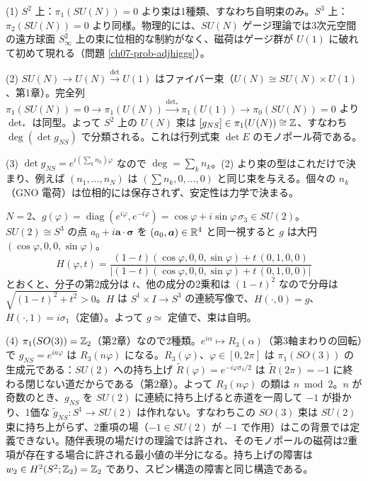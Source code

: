 \begin{solution}
(1) $S^2$ 上：$\pi_1(SU(N))=0$ より束は1種類、すなわち自明束のみ。$S^3$ 上：$\pi_2(SU(N))=0$ より同様。物理的には、$SU(N)$ ゲージ理論では3次元空間の遠方球面 $S^2_\infty$ 上の束に位相的な制約がなく、磁荷はゲージ群が $U(1)$ に破れて初めて現れる（問題 \ref{ch07-prob-adjhiggs}）。

(2) $SU(N)\to U(N)\xrightarrow{\det}U(1)$ はファイバー束（$U(N)\cong SU(N)\times U(1)$、第1章）。完全列 $\pi_1(SU(N))=0\to\pi_1(U(N))\xrightarrow{\det_*}\pi_1(U(1))\to\pi_0(SU(N))=0$ より $\det_*$ は同型。よって $S^2$ 上の $U(N)$ 束は $[g_{NS}]\in\pi_1(U(N))\cong\mathbb{Z}$、すなわち $\deg(\det g_{NS})$ で分類される。これは行列式束 $\det E$ のモノポール荷である。

(3) $\det g_{NS}=e^{i(\sum_kn_k)\varphi}$ なので $\deg=\sum_kn_k$。(2) より束の型はこれだけで決まり、例えば $(n_1,\dots,n_N)$ は $(\sum n_k,0,\dots,0)$ と同じ束を与える。個々の $n_k$（GNO 電荷）は位相的には保存されず、安定性は力学で決まる。

$N=2$、$g(\varphi)=\operatorname{diag}(e^{i\varphi},e^{-i\varphi})=\cos\varphi+i\sin\varphi\,\sigma_3\in SU(2)$。$SU(2)\cong S^3$ の点 $a_0+i\bm a\cdot\bm\sigma$ を $(a_0,\bm a)\in\mathbb{R}^4$ と同一視すると $g$ は大円 $(\cos\varphi,0,0,\sin\varphi)$。
\[
H(\varphi,t)=\frac{(1-t)(\cos\varphi,0,0,\sin\varphi)+t\,(0,1,0,0)}{\bigl\lvert(1-t)(\cos\varphi,0,0,\sin\varphi)+t\,(0,1,0,0)\bigr\rvert}
\]
とおくと、分子の第2成分は $t$、他の成分の2乗和は $(1-t)^2$ なので分母は $\sqrt{(1-t)^2+t^2}>0$。$H$ は $S^1\times I\to S^3$ の連続写像で、$H(\cdot,0)=g$、$H(\cdot,1)=i\sigma_1$（定値）。よって $g\simeq$ 定値で、束は自明。

(4) $\pi_1(SO(3))=\mathbb{Z}_2$（第2章）なので2種類。$e^{i\alpha}\mapsto R_3(\alpha)$（第3軸まわりの回転）で $g_{NS}=e^{in\varphi}$ は $R_3(n\varphi)$ になる。$R_3(\varphi)$、$\varphi\in[0,2\pi]$ は $\pi_1(SO(3))$ の生成元である：$SU(2)$ への持ち上げ $\tilde R(\varphi)=e^{-i\varphi\sigma_3/2}$ は $\tilde R(2\pi)=-1$ に終わる閉じない道だからである（第2章）。よって $R_3(n\varphi)$ の類は $n\bmod2$。$n$ が奇数のとき、$g_{NS}$ を $SU(2)$ に連続に持ち上げると赤道を一周して $-1$ が掛かり、1価な $\tilde g_{NS}\colon S^1\to SU(2)$ は作れない。すなわちこの $SO(3)$ 束は $SU(2)$ 束に持ち上がらず、2重項の場（$-1\in SU(2)$ が $-1$ で作用）はこの背景では定義できない。随伴表現の場だけの理論では許され、そのモノポールの磁荷は2重項が存在する場合に許される最小値の半分になる。持ち上げの障害は $w_2\in H^2(S^2;\mathbb{Z}_2)=\mathbb{Z}_2$ であり、スピン構造の障害と同じ構造である。
\end{solution}

